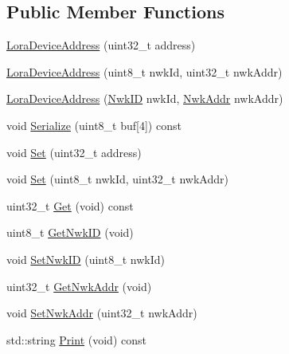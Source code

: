 \subsection*{Public Member Functions}
\begin{DoxyCompactItemize}
\item 
\hyperlink{classns3_1_1lorawan_1_1LoraDeviceAddress_a6aaf11c0f5ffc5da8dad5bdee0af961a}{Lora\+Device\+Address} (uint32\+\_\+t address)
\item 
\hyperlink{classns3_1_1lorawan_1_1LoraDeviceAddress_a8b0f78dd742fae5198def4127a77db36}{Lora\+Device\+Address} (uint8\+\_\+t nwk\+Id, uint32\+\_\+t nwk\+Addr)
\item 
\hyperlink{classns3_1_1lorawan_1_1LoraDeviceAddress_a67abdaddf3a98dd9c63d09216bd85314}{Lora\+Device\+Address} (\hyperlink{classns3_1_1lorawan_1_1NwkID}{Nwk\+ID} nwk\+Id, \hyperlink{classns3_1_1lorawan_1_1NwkAddr}{Nwk\+Addr} nwk\+Addr)
\item 
void \hyperlink{classns3_1_1lorawan_1_1LoraDeviceAddress_a8a9441f5c1d4ecce4b762e5fee408f53}{Serialize} (uint8\+\_\+t buf\mbox{[}4\mbox{]}) const
\item 
void \hyperlink{classns3_1_1lorawan_1_1LoraDeviceAddress_a657bbdd10455e832e8202e5bb09ab579}{Set} (uint32\+\_\+t address)
\item 
void \hyperlink{classns3_1_1lorawan_1_1LoraDeviceAddress_afaea2e488470d29fa3395412b11e7828}{Set} (uint8\+\_\+t nwk\+Id, uint32\+\_\+t nwk\+Addr)
\item 
uint32\+\_\+t \hyperlink{classns3_1_1lorawan_1_1LoraDeviceAddress_a35c8d5bd7f8ba32a206041ac0dd57cbc}{Get} (void) const
\item 
uint8\+\_\+t \hyperlink{classns3_1_1lorawan_1_1LoraDeviceAddress_a103e7e0827c9431014ae0181dea3f99f}{Get\+Nwk\+ID} (void)
\item 
void \hyperlink{classns3_1_1lorawan_1_1LoraDeviceAddress_a0629f296a4c397d67a17eddc6d4695d7}{Set\+Nwk\+ID} (uint8\+\_\+t nwk\+Id)
\item 
uint32\+\_\+t \hyperlink{classns3_1_1lorawan_1_1LoraDeviceAddress_a4879a48c10cf97a7fb07db00b8fcdb48}{Get\+Nwk\+Addr} (void)
\item 
void \hyperlink{classns3_1_1lorawan_1_1LoraDeviceAddress_a754b437f47c3ddcff15ccf060033ad62}{Set\+Nwk\+Addr} (uint32\+\_\+t nwk\+Addr)
\item 
std\+::string \hyperlink{classns3_1_1lorawan_1_1LoraDeviceAddress_a32bddd9c89d98e48c99b4dfef8cdf4d5}{Print} (void) const
\item 
\mbox{\label{classns3_1_1lorawan_1_1LoraDeviceAddress_ad0a69f4170aed26f06f43c5f3ca4c255}} 

\end{DoxyCompactItemize}
